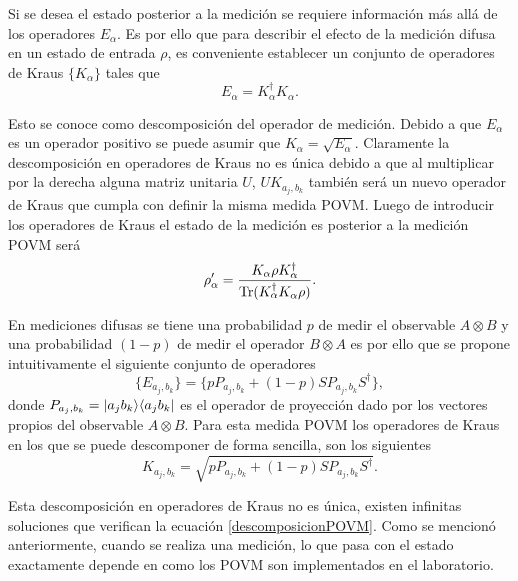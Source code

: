 Si se desea el estado posterior a la medición se requiere información
más allá de los operadores $E_\alpha$. Es por ello que para describir el efecto
de la medición difusa en un estado de entrada $\rho$, es conveniente establecer
un conjunto de operadores de Kraus $\{K_\alpha\}$ tales que
\begin{equation}\label{descomposicionPOVM}E_\alpha=K_\alpha^\dagger K_\alpha.\end{equation}

Esto se conoce como descomposición del operador de medición. Debido a que
$E_\alpha$ es un operador positivo se puede asumir que
$K_\alpha=\sqrt{E_\alpha}$. Claramente la descomposición en operadores de Kraus
no es única debido a que al multiplicar por la derecha alguna matriz unitaria
$U$, $UK_{a_j,b_k}$ también será un nuevo operador de Kraus que cumpla con
definir la misma medida POVM\@. Luego de introducir los operadores de Kraus el
estado de la medición es posterior a la medición POVM será
\begin{equation}\rho'_\alpha=\dfrac{K_\alpha \rho
K_\alpha^\dagger}{{\rm Tr}(K_\alpha^\dagger K_\alpha \rho)}.\end{equation}

 En mediciones difusas se tiene una probabilidad $p$ de medir el observable $A\otimes B$ y una probabilidad $(1-p)$ de medir el operador $B\otimes A$ es por ello que se  propone intuitivamente el siguiente conjunto de
operadores \begin{equation}\{E_{a_j, b_k}\}= \{p
P_{a_j,b_k}+(1-p)SP_{a_j,b_k}S^\dagger\},\end{equation} donde $P_{a_j,b_k} =
|a_j b_k\rangle \langle a_j b_k|$ es el operador de proyección dado por los vectores
propios del observable $A\otimes B$. Para esta medida POVM los operadores de
Kraus en los que se puede descomponer de forma sencilla, son los siguientes
\begin{equation}
K_{a_j, b_k}= \sqrt{p P_{a_j,b_k}+(1-p)SP_{a_j,b_k}S^\dagger}.
\end{equation}

Esta descomposición en operadores de Kraus no es única, existen infinitas soluciones que verifican la ecuación {\ref{descomposicionPOVM}}.
Como se mencionó anteriormente, cuando se realiza una medición, lo que pasa con
el estado exactamente depende en como los POVM son implementados en el
laboratorio.

